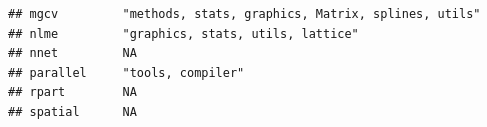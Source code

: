 \documentclass[]{article}
\begin{document}
\begin{verbatim}
## mgcv         "methods, stats, graphics, Matrix, splines, utils"                                                                                                                                                                                                                                                                                                                                                                                                                                    
## nlme         "graphics, stats, utils, lattice"                                                                                                                                                                                                                                                                                                                                                                                                                                                     
## nnet         NA                                                                                                                                                                                                                                                                                                                                                                                                                                                                                    
## parallel     "tools, compiler"                                                                                                                                                                                                                                                                                                                                                                                                                                                                     
## rpart        NA                                                                                                                                                                                                                                                                                                                                                                                                                                                                                    
## spatial      NA                                                                                                                                                                                                                                                                                                                                                                                                                                                                                    

\end{verbatim}
\end{document}
